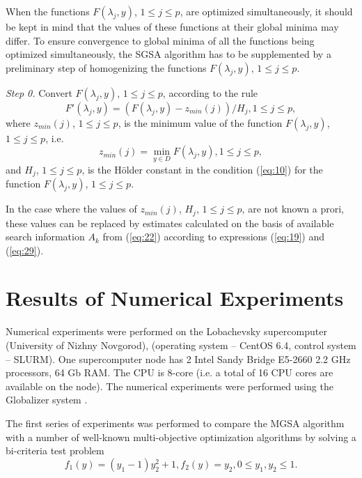 \documentclass[runningheads]{llncs}
\begin{document}
When the functions $F(\lambda_j,y)$, $1 \leq j \leq p$, are optimized simultaneously, it should be kept in mind that the values of these functions at their global minima may differ.  To ensure convergence to global minima of all the functions being optimized simultaneously, the SGSA algorithm has to be supplemented by a preliminary step of homogenizing the functions $F(\lambda_j,y)$, $1 \leq j \leq p$.

\textit{Step 0.} Convert $F(\lambda_j,y)$, $1 \leq j \leq p$, according to the rule
\begin{equation}
\label{eq:33}
F'(\lambda_j,y)=(F(\lambda_j,y)-z_{min} (j))/H_j, 1 \leq j \leq p,
\end{equation}
where $z_{min}(j)$, $1 \leq j \leq p$, is the minimum value of the function $F(\lambda_j,y)$, $1 \leq j \leq p$, i.e. 
\begin{equation}
\label{eq:34_2}
z_{min} (j)=\min_{y\in D}F(\lambda_j,y), 1 \leq j \leq p,
\end{equation}
and $H_j$, $1 \leq j \leq p$, is the H{\"o}lder constant in the condition (\ref{eq:10}) for the function $F(\lambda_j,y)$, $1 \leq j \leq p$.

In the case where the values of $z_{min} (j)$, $H_j$, $1 \leq j \leq p$, are not known a prori, these values can be replaced by estimates calculated on the basis of available search information $A_k$ from (\ref{eq:22}) according to expressions (\ref{eq:19}) and (\ref{eq:29}).


\section{Results of Numerical Experiments} \label{sec:05}

Numerical experiments were performed on the Lobachevsky supercomputer (University of Nizhny Novgorod), (operating system -- CentOS 6.4, control system -- SLURM). One supercomputer node has 2 Intel Sandy Bridge E5-2660 2.2 GHz processors, 64 Gb RAM. The CPU is 8-core (i.e. a total of 16 CPU cores are available on the node). The numerical experiments were performed using the Globalizer system \cite{c36}.

      The first series of experiments was performed to compare the MGSA algorithm with a number of well-known multi-objective optimization algorithms by solving a bi-criteria test problem \cite{c40}
\begin{equation}
\label{eq:35}
f_1 (y)=(y_1-1) y_2^2+1,f_2 (y)=y_2, 0 \leq y_1, y_2 \leq 1.
\end{equation}
\end{document}
